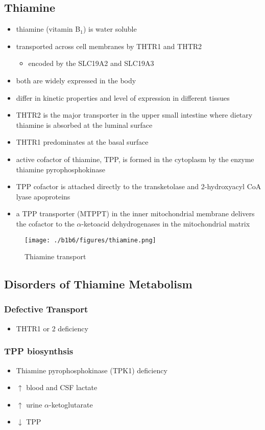 \documentclass{scrartcl}
\begin{document}
\subsection{Thiamine}
\label{sec:org29ecb98}
\begin{itemize}
\item thiamine (vitamin B\(_{\text{1}}\)) is water soluble
\item transported across cell membranes by THTR1 and THTR2
\begin{itemize}
\item encoded by the SLC19A2 and SLC19A3
\end{itemize}
\item both are widely expressed in the body
\item differ in kinetic properties and level of expression in different tissues
\item THTR2 is the major transporter in the upper small intestine where
dietary thiamine is absorbed at the luminal surface
\item THTR1 predominates at the basal surface
\item active cofactor of thiamine, TPP, is formed in the cytoplasm by the
enzyme thiamine pyrophosphokinase
\item TPP cofactor is attached directly to the transketolase and 2-hydroxyacyl CoA lyase apoproteins
\item a TPP transporter (MTPPT) in the inner mitochondrial membrane
delivers the cofactor to the \(\alpha\)-ketoacid dehydrogenases in the
mitochondrial matrix
\end{itemize}

\begin{figure}[htbp]
\centering
\texttt{[image: ./b1b6/figures/thiamine.png]}
\caption{\label{fig:org0f9919d}
Thiamine transport}
\end{figure}

\subsection{Disorders of Thiamine Metabolism}
\label{sec:org36061d7}
\subsubsection{Defective Transport}
\label{sec:org9f31122}
\begin{itemize}
\item THTR1 or 2 deficiency
\end{itemize}
\subsubsection{TPP biosynthsis}
\label{sec:org4239360}
\begin{itemize}
\item Thiamine pyrophosphokinase (TPK1) deficiency
\item \(\uparrow\) blood and CSF lactate
\item \(\uparrow\) urine \(\alpha\)-ketoglutarate
\item \(\downarrow\) TPP
\end{itemize}
\end{document}
